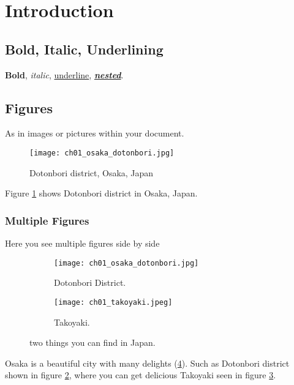 \section{Introduction}
\lipsum[1]

\subsection{Bold, Italic, Underlining}
\textbf{Bold}, \textit{italic}, \underline{underline}, \textbf{\textit{\underline{nested}}}.

\subsection{Figures}
As in images or pictures within your document.

\begin{figure}[h!]
    \centering
    \texttt{[image: ch01\_osaka\_dotonbori.jpg]}
    \caption{Dotonbori district, Osaka, Japan}
    \label{fig:dotonbori}
\end{figure}

Figure \ref{fig:dotonbori} shows Dotonbori district in Osaka, Japan.

\subsubsection{Multiple Figures}

Here you see multiple figures side by side

\begin{figure}[h!]
  \centering
  \begin{subfigure}[b]{0.4\linewidth}
    \texttt{[image: ch01\_osaka\_dotonbori.jpg]}
    \caption{Dotonbori District.}
    \label{fig:osaka-dotonbori-district}
  \end{subfigure}
  \begin{subfigure}[b]{0.4\linewidth}
    \texttt{[image: ch01\_takoyaki.jpeg]}
    \caption{Takoyaki.}
    \label{fig:fresh-takoyaki}
  \end{subfigure}
  \caption{two things you can find in Japan.}
  \label{fig:twothingsinjpn}
\end{figure}

Osaka is a beautiful city with many delights (\ref{fig:twothingsinjpn}).
Such as Dotonbori district shown in figure \ref{fig:osaka-dotonbori-district}, where you can get delicious Takoyaki seen in figure \ref{fig:fresh-takoyaki}.

